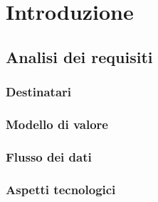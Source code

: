 \chapter{Introduzione}

\section{Analisi dei requisiti}

\subsection{Destinatari}

\subsection{Modello di valore}

\subsection{Flusso dei dati}

\subsection{Aspetti tecnologici}